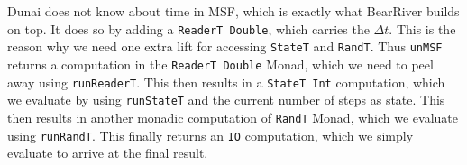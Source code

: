 Dunai does not know about time in MSF, which is exactly what BearRiver builds on top. It does so by adding a \texttt{ReaderT Double}, which carries the $\Delta t$. This is the reason why we need one extra lift for accessing \texttt{StateT} and \texttt{RandT}. Thus \texttt{unMSF} returns a computation in the \texttt{ReaderT Double} Monad, which we need to peel away using \texttt{runReaderT}. This then results in a \texttt{StateT Int} computation, which we evaluate by using \texttt{runStateT} and the current number of steps as state. This then results in another monadic computation of \texttt{RandT} Monad, which we evaluate using \texttt{runRandT}. This finally returns an \texttt{IO} computation, which we simply evaluate to arrive at the final result.